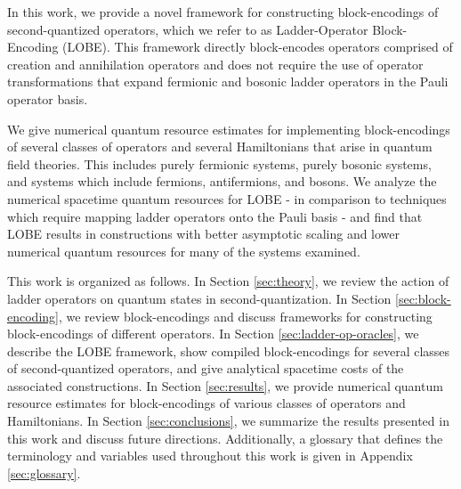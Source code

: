 In this work, we provide a novel framework for constructing block-encodings of second-quantized operators, which we refer to as Ladder-Operator Block-Encoding (LOBE).
This framework directly block-encodes operators comprised of creation and annihilation operators and does not require the use of operator transformations that expand fermionic \cite{jordan1928paulische, bravyi2002fermionic, seeley2012bravyi} and bosonic \cite{somma2005quantum,standard-binary} ladder operators in the Pauli operator basis.

We give numerical quantum resource estimates for implementing block-encodings of several classes of operators and several Hamiltonians that arise in quantum field theories.
This includes purely fermionic systems, purely bosonic systems, and systems which include fermions, antifermions, and bosons. 
We analyze the numerical spacetime quantum resources for LOBE - in comparison to techniques which require mapping ladder operators onto the Pauli basis - and find that LOBE results in constructions with better asymptotic scaling and lower numerical quantum resources for many of the systems examined.

This work is organized as follows.
In Section \ref{sec:theory}, we review the action of ladder operators on quantum states in second-quantization.
In Section \ref{sec:block-encoding}, we review block-encodings and discuss frameworks for constructing block-encodings of different operators.
In Section \ref{sec:ladder-op-oracles}, we describe the LOBE framework, show compiled block-encodings for several classes of second-quantized operators, and give analytical spacetime costs of the associated constructions.
In Section \ref{sec:results}, we provide numerical quantum resource estimates for block-encodings of various classes of operators and Hamiltonians.
In Section \ref{sec:conclusions}, we summarize the results presented in this work and discuss future directions.
Additionally, a glossary that defines the terminology and variables used throughout this work is given in Appendix \ref{sec:glossary}.
